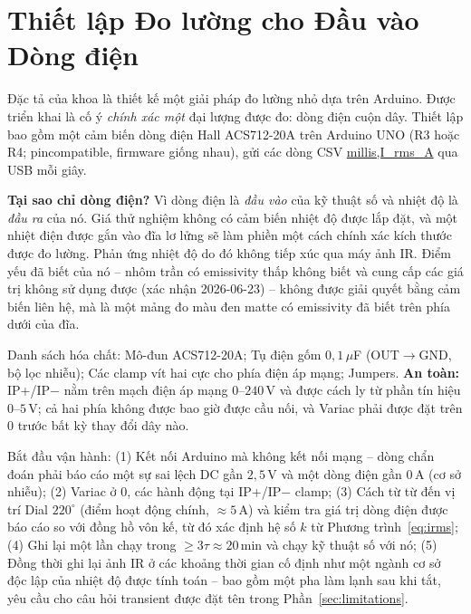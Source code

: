 \documentclass[a4paper, 10pt, conference]{ieeeconf}
\theoremstyle{remark}
\begin{document}
\section{Thiết lập Đo lường cho Đầu vào Dòng điện}
\label{app:sensor}

Đặc tả của khoa là thiết kế một giải pháp đo lường nhỏ dựa trên Arduino. Được triển
khai là cố ý \emph{chính xác một} đại lượng được đo: dòng điện cuộn dây. Thiết lập
bao gồm một cảm biến dòng điện Hall ACS712-20A trên Arduino UNO (R3 hoặc R4;
pincompatible, firmware giống nhau), gửi các dòng CSV \url{millis,I_rms_A} qua USB
mỗi giây.

\textbf{Tại sao chỉ dòng điện?} Vì dòng điện là \emph{đầu vào} của kỹ thuật số và
nhiệt độ là \emph{đầu ra} của nó. Giá thử nghiệm không có cảm biến nhiệt độ được lắp
đặt, và một nhiệt điện được gắn vào đĩa lơ lửng sẽ làm phiền một cách chính xác kích
thước được đo lường. Phản ứng nhiệt độ do đó không tiếp xúc qua máy ảnh IR. Điểm yếu
đã biết của nó -- nhôm trần có emissivity thấp không biết và cung cấp các giá trị
không sử dụng được (xác nhận 2026-06-23) -- không được giải quyết bằng cảm biến liên
hệ, mà là một mảng đo màu đen matte có emissivity đã biết trên phía dưới của đĩa.

Danh sách hóa chất: Mô-đun ACS712-20A; Tụ điện gốm $0{,}1\,\mu$F (OUT$\to$GND, bộ
lọc nhiễu); Các clamp vít hai cực cho phía điện áp mạng; Jumpers. \textbf{An toàn:}
IP+/IP$-$ nằm trên mạch điện áp mạng $0$--$240\,\mathrm V$ và được cách ly từ
phần tín hiệu $0$--$5\,\mathrm V$; cả hai phía không được bao giờ được cầu nối, và
Variac phải được đặt trên $0$ trước bất kỳ thay đổi dây nào.

Bắt đầu vận hành: (1) Kết nối Arduino mà không kết nối mạng -- dòng chẩn đoán phải
báo cáo một sự sai lệch DC gần $2{,}5\,\mathrm V$ và một dòng điện gần $0\,\mathrm A$
(cơ sở nhiễu); (2) Variac ở $0$, các hành động tại IP+/IP$-$ clamp; (3) Cách từ từ
đến vị trí Dial $220^\circ$ (điểm hoạt động chính, $\approx5\,\mathrm A$) và kiểm tra
giá trị dòng điện được báo cáo so với đồng hồ vôn kế, từ đó xác định hệ số $k$ từ
Phương trình~\eqref{eq:irms}; (4) Ghi lại một lần chạy trong $\geq3\tau\approx20\,\mathrm{min}$
và chạy kỹ thuật số với nó; (5) Đồng thời ghi lại ảnh IR ở các khoảng thời gian cố
định như một ngành cơ sở độc lập của nhiệt độ được tính toán -- bao gồm một pha làm
lạnh sau khi tắt, yêu cầu cho câu hỏi transient được đặt tên trong Phần~\ref{sec:limitations}.



\end{document}
